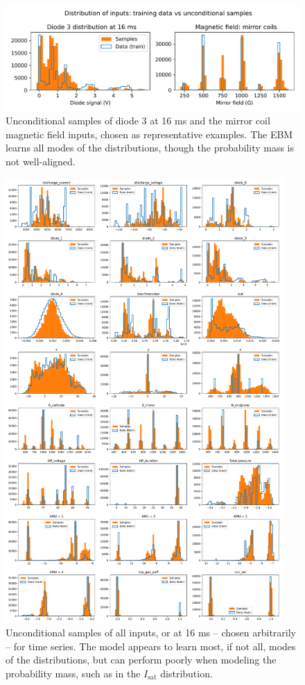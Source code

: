 \begin{figure}
	\centering
	\includegraphics[width=\linewidth]{figures/uncond_diode-3_B-mirror_39-0.pdf}
	\caption[Unconditional samples -- diode 3 and mirror field]{\label{fig:uncond_examples}Unconditional samples of diode 3 at 16 ms and the mirror coil magnetic field inputs, chosen as representative examples. The EBM learns all modes of the distributions, though the probability mass is not well-aligned.}
\end{figure}

\begin{figure}
	\centering
	\includegraphics[width=300pt]{figures/uncond_histograms_39-0.pdf}
	\caption[Unconditional samples -- all inputs]{\label{fig:uncond_dist_full}Unconditional samples of all inputs, or at 16 ms -- chosen arbitrarily -- for time series. The model appears to learn most, if not all, modes of the distributions, but can perform poorly when modeling the probability mass, such as in the $I_\text{sat}$ distribution.}
\end{figure}

